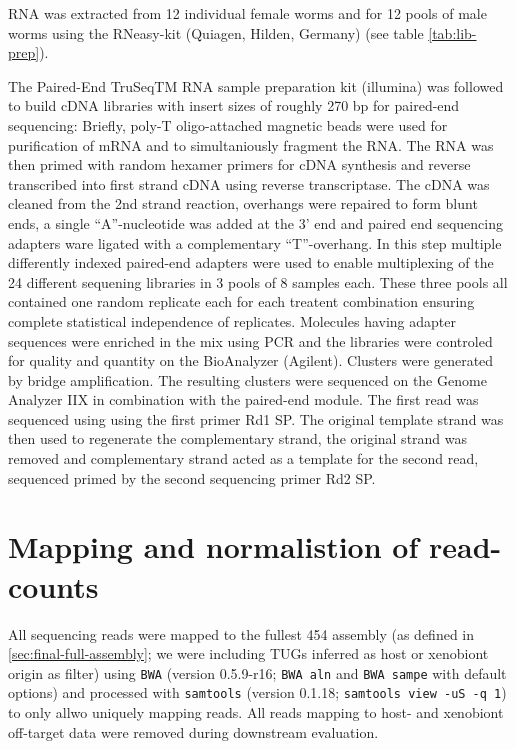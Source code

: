 RNA was extracted from 12 individual female worms and for 12 pools of
male worms using the RNeasy-kit (Quiagen, Hilden, Germany) (see table
\ref{tab:lib-prep}).

The Paired-End TruSeqTM RNA sample preparation kit (illumina) was
followed to build cDNA libraries with insert sizes of roughly 270 bp
for paired-end sequencing: Briefly, poly-T oligo-attached magnetic
beads were used for purification of mRNA and to simultaniously
fragment the RNA. The RNA was then primed with random hexamer primers
for cDNA synthesis and reverse transcribed into first strand cDNA
using reverse transcriptase. The cDNA was cleaned from the 2nd strand
reaction, overhangs were repaired to form blunt ends, a single
``A''-nucleotide was added at the 3' end and paired end sequencing
adapters ware ligated with a complementary ``T''-overhang. In this
step multiple differently indexed paired-end adapters were used to
enable multiplexing of the 24 different sequening libraries in 3 pools
of 8 samples each. These three pools all contained one random
replicate each for each treatent combination ensuring complete
statistical independence of replicates. Molecules having adapter
sequences were enriched in the mix using PCR and the libraries were
controled for quality and quantity on the BioAnalyzer
(Agilent). Clusters were generated by bridge amplification. The
resulting clusters were sequenced on the Genome Analyzer IIX in
combination with the paired-end module. The first read was sequenced
using using the first primer Rd1 SP. The original template strand was
then used to regenerate the complementary strand, the original strand
was removed and complementary strand acted as a template for the
second read, sequenced primed by the second sequencing primer Rd2 SP.

\section{Mapping and normalistion of read-counts}

All sequencing reads were mapped to the fullest 454 assembly (as
defined in \ref{sec:final-full-assembly}; we were including TUGs
inferred as host or xenobiont origin as filter) using \texttt{BWA}
\cite{pmid20080505} (version 0.5.9-r16; \texttt{BWA aln} and
\texttt{BWA sampe} with default options) and processed with
\texttt{samtools} \cite{journals/bioinformatics/LiHWFRHMAD09} (version
0.1.18; \texttt{samtools view -uS -q 1}) to only allwo uniquely
mapping reads. All reads mapping to host- and xenobiont off-target
data were removed during downstream evaluation.

